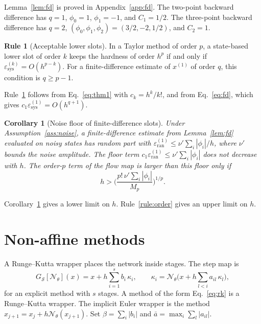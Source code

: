 \documentclass[11pt]{article}
\newtheorem{corollary}{Corollary}
\theoremstyle{definition}
\newtheorem{designrule}{Rule}
\theoremstyle{remark}
\newcommand{\Net}{\mathcal{N}_\theta}    %
\newcommand{\Meth}{\mathcal{S}}          %
\newcommand{\sys}{\mathrm{sys}}
\newcommand{\ran}{\mathrm{ran}}
\begin{document}
Lemma~\ref{lem:fd} is proved in Appendix~\ref{app:fd}.
The two-point backward difference has $q = 1$, $\phi_0 = 1$, $\phi_1 = -1$, and $C_1 = 1/2$.
The three-point backward difference has $q = 2$, $(\phi_0, \phi_1, \phi_2) = (3/2, -2, 1/2)$, and $C_2 = 1$.

\begin{designrule}[Acceptable lower slots]\label{rule:fd}
In a Taylor method of order $p$, a state-based lower slot of order $k$ keeps the hardness of order $h^p$ if and only if $\varepsilon^{(k)}_\sys = O(h^{p-k})$.
For a finite-difference estimate of $x^{(1)}$ of order $q$, this condition is $q \ge p - 1$.
\end{designrule}

Rule~\ref{rule:fd} follows from Eq.~\eqref{eq:thm1} with $c_k = h^k/k!$, and from Eq.~\eqref{eq:fd}, which gives $c_1 \varepsilon^{(1)}_\sys = O(h^{q+1})$.

\begin{corollary}[Noise floor of finite-difference slots]\label{cor:noise}
Under Assumption~\ref{ass:noise}, a finite-difference estimate from Lemma~\ref{lem:fd} evaluated on noisy states has random part with $\varepsilon^{(1)}_\ran \le \nu' \sum_i |\phi_i| / h$, where $\nu'$ bounds the noise amplitude.
The floor term $c_1 \varepsilon^{(1)}_\ran \le \nu' \sum_i |\phi_i|$ does not decrease with $h$.
The order-$p$ term of the flow map is larger than this floor only if
\begin{equation}\label{eq:noisewindow}
h > \Big(\frac{p!\, \nu' \sum_i |\phi_i|}{M_p}\Big)^{1/p}.
\end{equation}
\end{corollary}

Corollary~\ref{cor:noise} gives a lower limit on $h$.
Rule~\ref{rule:order} gives an upper limit on $h$.

\section{Non-affine methods}\label{sec:nonaffine}

A Runge--Kutta wrapper places the network inside stages.
The step map is
\begin{equation}\label{eq:rk}
G_\Meth[\Net](x) = x + h \sum_{i=1}^{s} b_i\, \kappa_i, \qquad \kappa_i = \Net\Big(x + h\sum_{l<i} a_{il}\, \kappa_l\Big),
\end{equation}
for an explicit method with $s$ stages.
A method of the form Eq.~\eqref{eq:rk} is a Runge--Kutta wrapper.
The implicit Euler wrapper is the method $x_{j+1} = x_j + h\Net(x_{j+1})$.
Set $\beta = \sum_i |b_i|$ and $\bar a = \max_i \sum_l |a_{il}|$.
\end{document}
